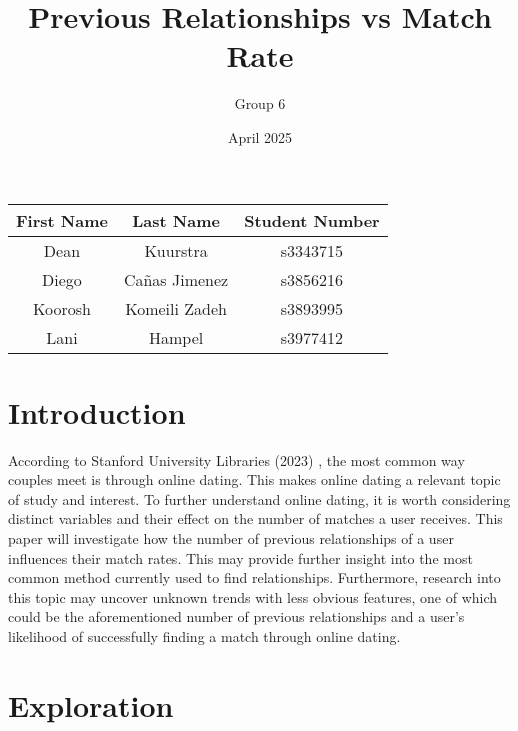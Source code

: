 \documentclass{article}
\title{Previous Relationships vs Match Rate}
\author{Group 6}
\date{April 2025}
\begin{document}
\maketitle

\begin{table}[ht]
    \centering
    \begin{tabular}{ccc} 
    \toprule
    \textbf{First Name} & \textbf{Last Name} & \textbf{Student Number} \\ 
    \midrule
    Dean & Kuurstra    & s3343715 \\ 
    Diego & Cañas Jimenez & s3856216 \\
    Koorosh & Komeili Zadeh & s3893995 \\ 
    Lani & Hampel & s3977412 \\ 
    \bottomrule
    \end{tabular}
    \label{tab:group6_members}
\end{table}

\section{Introduction}

According to Stanford University Libraries (2023) \cite{rosenfeld2023}, the most common way couples meet is through online dating. This makes online dating a relevant topic of study and interest. To further understand online dating, it is worth considering distinct variables and their effect on the number of matches a user receives. This paper will investigate how the number of previous relationships of a user influences their match rates. This may provide further insight into the most common method currently used to find relationships. Furthermore, research into this topic may uncover unknown trends with less obvious features, one of which could be the aforementioned number of previous relationships and a user’s likelihood of successfully finding a match through online dating.

\section{Exploration}

\end{document}
